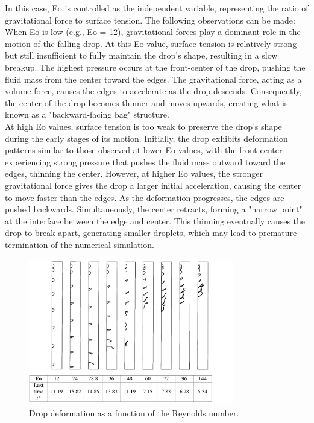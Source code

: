 \documentclass[12pt]{article}
\begin{document}
In this case, Eo is controlled as the independent variable, representing the ratio of gravitational force to surface tension. The following observations can be made:\\

When Eo is low (e.g., Eo = 12), gravitational forces play a dominant role in the motion of the falling drop. At this Eo value, surface tension is relatively strong but still insufficient to fully maintain the drop’s shape, resulting in a slow breakup. The highest pressure occurs at the front-center of the drop, pushing the fluid mass from the center toward the edges. The gravitational force, acting as a volume force, causes the edges to accelerate as the drop descends. Consequently, the center of the drop becomes thinner and moves upwards, creating what is known as a "backward-facing bag" structure.\\

At high Eo values, surface tension is too weak to preserve the drop’s shape during the early stages of its motion. Initially, the drop exhibits deformation patterns similar to those observed at lower Eo values, with the front-center experiencing strong pressure that pushes the fluid mass outward toward the edges, thinning the center. However, at higher Eo values, the stronger gravitational force gives the drop a larger initial acceleration, causing the center to move faster than the edges. As the deformation progresses, the edges are pushed backwards. Simultaneously, the center retracts, forming a "narrow point" at the interface between the edge and center. This thinning eventually causes the drop to break apart, generating smaller droplets, which may lead to premature termination of the numerical simulation.














\begin{figure}[H]
    \centering
    \includegraphics[width=0.8\textwidth]{Latex/figures/Trygg_allEo.jpg}
    \caption{Drop deformation as a function of the Reynolds number.}
    \label{deformation}
\end{figure}
\end{document}

